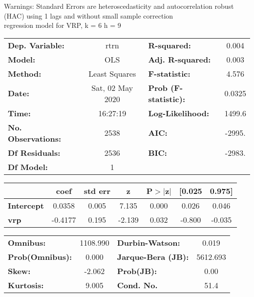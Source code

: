 Warnings: \newline
 [1] Standard Errors are heteroscedasticity and autocorrelation robust (HAC) using 1 lags and without small sample correction\\ 

regression model for VRP, k = 6 h = 9\begin{center}
\begin{tabular}{lclc}
\toprule
\textbf{Dep. Variable:}    &       rtrn       & \textbf{  R-squared:         } &     0.004   \\
\textbf{Model:}            &       OLS        & \textbf{  Adj. R-squared:    } &     0.003   \\
\textbf{Method:}           &  Least Squares   & \textbf{  F-statistic:       } &     4.576   \\
\textbf{Date:}             & Sat, 02 May 2020 & \textbf{  Prob (F-statistic):} &   0.0325    \\
\textbf{Time:}             &     16:27:19     & \textbf{  Log-Likelihood:    } &    1499.6   \\
\textbf{No. Observations:} &        2538      & \textbf{  AIC:               } &    -2995.   \\
\textbf{Df Residuals:}     &        2536      & \textbf{  BIC:               } &    -2983.   \\
\textbf{Df Model:}         &           1      & \textbf{                     } &             \\
\bottomrule
\end{tabular}
\begin{tabular}{lcccccc}
                   & \textbf{coef} & \textbf{std err} & \textbf{z} & \textbf{P$> |$z$|$} & \textbf{[0.025} & \textbf{0.975]}  \\
\midrule
\textbf{Intercept} &       0.0358  &        0.005     &     7.135  &         0.000        &        0.026    &        0.046     \\
\textbf{vrp}       &      -0.4177  &        0.195     &    -2.139  &         0.032        &       -0.800    &       -0.035     \\
\bottomrule
\end{tabular}
\begin{tabular}{lclc}
\textbf{Omnibus:}       & 1108.990 & \textbf{  Durbin-Watson:     } &    0.019  \\
\textbf{Prob(Omnibus):} &   0.000  & \textbf{  Jarque-Bera (JB):  } & 5612.693  \\
\textbf{Skew:}          &  -2.062  & \textbf{  Prob(JB):          } &     0.00  \\
\textbf{Kurtosis:}      &   9.005  & \textbf{  Cond. No.          } &     51.4  \\
\bottomrule
\end{tabular}
\end{center}

